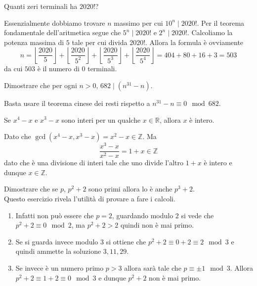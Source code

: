 \begin{esercizio}
	Quanti zeri terminali ha $2020!$?
	
	Essenzialmente dobbiamo trovare $n$ massimo per cui $10^n \mid 2020!$. Per il teorema fondamentale dell'aritmetica segue che 
	$5^n \mid 2020!$ e $2^n \mid 2020!$. Calcoliamo la potenza massima di $5$ tale per cui divida $2020!$. 
	Allora la formula è ovviamente 
	\begin{equation*}
		n = \left\lfloor \frac{2020}{5} \right\rfloor + \left\lfloor \frac{2020}{5^2} \right\rfloor + \left\lfloor \frac{2020}{5^3} \right\rfloor + \left\lfloor \frac{2020}{5^4} \right\rfloor = 404 + 80 + 16 + 3 = 503
	\end{equation*}
    da cui $503$ è il numero di $0$ terminali.
\end{esercizio}

\begin{esercizio}
	Dimostrare che per ogni $n > 0$, $682 \mid (n^{31} - n)$.
	
	Basta usare il teorema cinese dei resti rispetto a $n^{31} - n \equiv 0 \mod 682$.
\end{esercizio}

\begin{esercizio}
	Se $x^4 - x$ e $x^3 - x$ sono interi per un qualche $x \in \mathbb{R}$, allora $x$ è intero.
	
	Dato che $\gcd(x^4 - x, x^3 - x) = x^2 - x \in \mathbb{Z}$.
	Ma 
	\begin{equation*}
		\frac{x^3 - x}{x^2 - x} = 1+x \in \mathbb{Z}
	\end{equation*}
	dato che è una divisione di interi tale che uno divide l'altro $1+x$ è intero e dunque $x \in \mathbb{Z}$.
\end{esercizio}

\begin{esercizio}
	Dimostrare che se $p$, $p^2 + 2$ sono primi allora lo è anche $p^3 +2$.\\
	
	Questo esercizio rivela l'utilità di provare a fare i calcoli. 
	\begin{enumerate}
		\item Infatti non può essere che $p = 2$, 
		guardando modulo $2$ si vede che 
		$p^2 + 2 \equiv 0 \mod 2$, ma $p^2 + 2 > 2$ quindi non è mai primo.
		\item Se si guarda invece modulo $3$ si ottiene che
		$p^2 + 2 \equiv 0 + 2 \equiv 2 \mod 3$ e quindi ammette 
		la soluzione $3, 11, 29$.
		\item Se invece è un numero primo $p > 3$ allora sarà tale che $p \equiv \pm 1\mod 3$. 
		Allora $p^2 + 2 \equiv 1 + 2 \equiv 0 \mod 3$ e 
		dunque $p^2 + 2$ non è mai primo.  
	\end{enumerate}	 
\end{esercizio}


